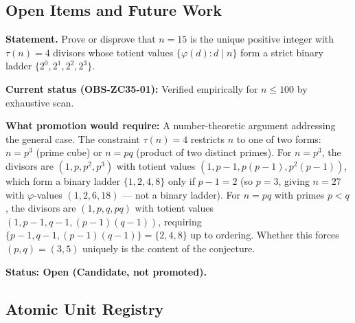 \documentclass[12pt, a4paper]{article}
\begin{document}
\subsection{Open Items and Future Work}
\label{sec:open}

\begin{openqbox}[title={GAP-ZC35-01: Z\textsubscript{15} Binary-Ladder
  Uniqueness for All $n$}]
\textbf{Statement.} Prove or disprove that $n = 15$ is the unique
positive integer with $\tau(n) = 4$ divisors whose totient values
$\{\varphi(d) : d \mid n\}$ form a strict binary ladder
$\{2^0, 2^1, 2^2, 2^3\}$.

\medskip
\textbf{Current status (OBS-ZC35-01):} Verified empirically for
$n \le 100$ by exhaustive scan.

\medskip
\textbf{What promotion would require:} A number-theoretic argument
addressing the general case. The constraint $\tau(n) = 4$ restricts
$n$ to one of two forms: $n = p^3$ (prime cube) or $n = pq$ (product
of two distinct primes). For $n = p^3$, the divisors are $(1,p,p^2,p^3)$
with totient values $(1, p-1, p(p-1), p^2(p-1))$, which form a binary
ladder $\{1,2,4,8\}$ only if $p-1 = 2$ (so $p = 3$, giving $n = 27$
with $\varphi$-values $(1,2,6,18)$ --- not a binary ladder). For
$n = pq$ with primes $p < q$, the divisors are $(1,p,q,pq)$ with totient
values $(1, p-1, q-1, (p-1)(q-1))$, requiring $\{p-1, q-1, (p-1)(q-1)\}
= \{2,4,8\}$ up to ordering. Whether this forces $(p,q) = (3,5)$
uniquely is the content of the conjecture.

\medskip
\textbf{Status: Open (Candidate, not promoted).}
\end{openqbox}

\subsection{Atomic Unit Registry}
\label{sec:registry}
\end{document}
